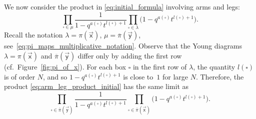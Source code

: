 \documentclass[pdftex]{sigma}
\numberwithin{equation}{section}
\begin{document}
We now consider the product
in \eqref{eq:initial_formula}
involving arms and legs:
\begin{equation}
	\label{eq:arm_leg_product_initial}
	\prod_{\square\in \mu}
	\frac{1}
	{1-q^{a(\square)}t^{l(\square)+1}}
	\prod_{\square\in \lambda}
	\bigl(1-q^{a(\square)}t^{l(\square)+1}\bigr).
\end{equation}
Recall the notation
$\lambda=\pi(\vec{\mathsf{x}})$,
$\mu=\overline\pi(\vec{\mathsf{y}})$, see~\eqref{eq:pi_maps_multiplicative_notation}.
Observe that the Young diagrams
$\lambda=\pi(\vec{\mathsf{x}})$ and
$\overline\pi(\vec{\mathsf{y}})$ differ only by
adding the first row (cf.\ Figure~\ref{fig:pi_of_x}).
For each box $\square$ in the first row of $\lambda$, the quantity
$l(\square)$ is of order $N$, and so
$1-q^{a(\square)}t^{l(\square)+1}$ is close to~$1$
for large $N$.
Therefore, the product
\eqref{eq:arm_leg_product_initial}
has the same limit as
\begin{equation}	\label{eq:arm_leg_product_proof_1}
	\prod_{\square\in \overline\pi(\vec{\mathsf{y}})}
	\frac{1}
	{1-q^{a(\square)}t^{l(\square)+1}}
	\prod_{\square\in \overline\pi(\vec{\mathsf{x}})}
	\bigl(1-q^{a(\square)}t^{l(\square)+1}\bigr).
\end{equation}
\end{document}
